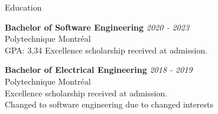 \documentclass{resume} %
\begin{document}
	
	
	\begin{rSection}{Education}
		
		{\bf Bachelor of Software Engineering} \hfill {\em 2020 - 2023} 
		\\ Polytechnique Montréal
		\\GPA: 3,34 \hspace{0.5cm}  Excellence scholarship received at admission.

		{\bf Bachelor of Electrical Engineering} \hfill {\em 2018 - 2019} 
		\\ Polytechnique Montréal
		\\ Excellence scholarship received at admission.
		\\ Changed to software engineering due to changed interests
		
	\end{rSection}
	
\end{document}
